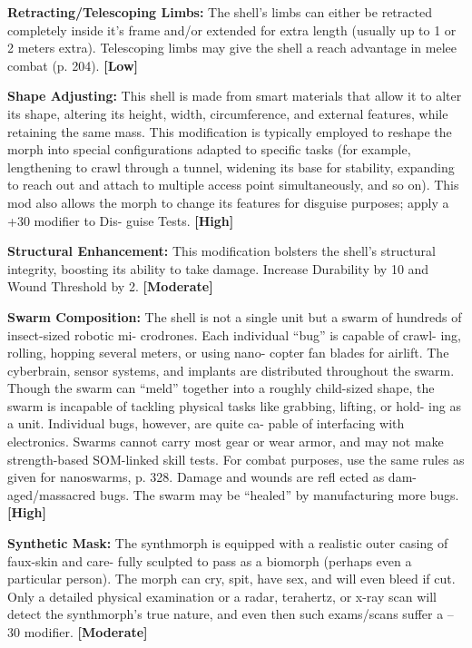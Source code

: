 \textbf{Retracting/Telescoping Limbs:} The shell's limbs can 
either be retracted completely inside it's frame and/or 
extended for extra length (usually up to 1 or 2 meters 
extra). Telescoping limbs may give the shell a reach 
advantage in melee combat (p. 204). \textbf{[Low]}

\textbf{Shape Adjusting:} This shell is made from smart 
materials that allow it to alter its shape, altering its 
height, width, circumference, and external features, 
while retaining the same mass. This modification is 
typically employed to reshape the morph into special 
configurations adapted to specific tasks (for example, 
lengthening to crawl through a tunnel, widening its 
base for stability, expanding to reach out and attach 
to multiple access point simultaneously, and so on). 
This mod also allows the morph to change its features 
for disguise purposes; apply a +30 modifier to Dis-
guise Tests. \textbf{[High]}

\textbf{Structural Enhancement:} This modification bolsters 
the shell's structural integrity, boosting its ability to 
take damage. Increase Durability by 10 and Wound 
Threshold by 2. \textbf{[Moderate]}

\textbf{Swarm Composition:} The shell is not a single unit 
but a swarm of hundreds of insect-sized robotic mi-
crodrones. Each individual ``bug'' is capable of crawl-
ing, rolling, hopping several meters, or using nano-
copter fan blades for airlift. The cyberbrain, sensor 
systems, and implants are distributed throughout the 
swarm. Though the swarm can ``meld'' together into 
a roughly child-sized shape, the swarm is incapable of 
tackling physical tasks like grabbing, lifting, or hold-
ing as a unit. Individual bugs, however, are quite ca-
pable of interfacing with electronics. Swarms cannot 
carry most gear or wear armor, and may not make 
strength-based SOM-linked skill tests. For combat 
purposes, use the same rules as given for nanoswarms, 
p. 328. Damage and wounds are refl ected as dam-
aged/massacred bugs. The swarm may be ``healed'' by 
manufacturing more bugs.\textbf{[High]}

\textbf{Synthetic Mask:} The synthmorph is equipped 
with a realistic outer casing of faux-skin and care-
fully sculpted to pass as a biomorph (perhaps even a 
particular person). The morph can cry, spit, have sex, 
and will even bleed if cut. Only a detailed physical 
examination or a radar, terahertz, or x-ray scan will 
detect the synthmorph's true nature, and even then 
such exams/scans suffer a –30 modifier. \textbf{[Moderate]}

